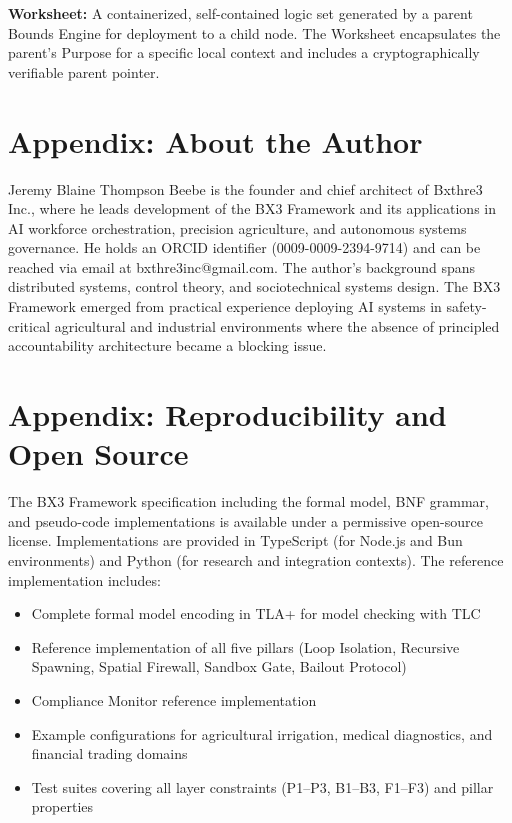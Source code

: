 \documentclass[12pt]{article}
\begin{document}
\textbf{Worksheet:} A containerized, self-contained logic set generated by a parent Bounds Engine for deployment to a child node. The Worksheet encapsulates the parent's Purpose for a specific local context and includes a cryptographically verifiable parent pointer.

\section{Appendix: About the Author}
Jeremy Blaine Thompson Beebe is the founder and chief architect of Bxthre3 Inc., where he leads development of the BX3 Framework and its applications in AI workforce orchestration, precision agriculture, and autonomous systems governance. He holds an ORCID identifier (0009-0009-2394-9714) and can be reached via email at bxthre3inc@gmail.com. The author's background spans distributed systems, control theory, and sociotechnical systems design. The BX3 Framework emerged from practical experience deploying AI systems in safety-critical agricultural and industrial environments where the absence of principled accountability architecture became a blocking issue.

\section{Appendix: Reproducibility and Open Source}
The BX3 Framework specification including the formal model, BNF grammar, and pseudo-code implementations is available under a permissive open-source license. Implementations are provided in TypeScript (for Node.js and Bun environments) and Python (for research and integration contexts). The reference implementation includes:

\begin{itemize}
\item Complete formal model encoding in TLA+ for model checking with TLC
\item Reference implementation of all five pillars (Loop Isolation, Recursive Spawning, Spatial Firewall, Sandbox Gate, Bailout Protocol)
\item Compliance Monitor reference implementation
\item Example configurations for agricultural irrigation, medical diagnostics, and financial trading domains
\item Test suites covering all layer constraints (P1--P3, B1--B3, F1--F3) and pillar properties
\end{itemize}
\end{document}
